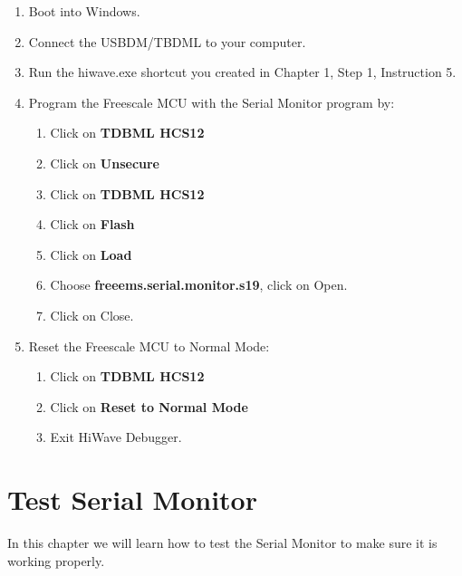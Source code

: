 \documentclass[12pt,notitlepage,onecolumn,oneside,openany]{memoir}
\begin{document}
\begin{enumerate}

\item \textsf{Boot into Windows.}

\item \textsf{Connect the USBDM/TBDML to your computer.}

\item \textsf{Run the hiwave.exe shortcut you created in Chapter 1, Step 1, Instruction 5.}

\item \textsf{Program the Freescale MCU with the Serial Monitor program by:} 
      \begin{enumerate}
      \item \textsf{Click on  \textbf{TDBML HCS12}}
      \item \textsf{Click on  \textbf{Unsecure}}
      \item \textsf{Click on  \textbf{TDBML HCS12}}
      \item \textsf{Click on  \textbf{Flash}}
      \item \textsf{Click on  \textbf{Load}}
      \item \textsf{Choose \textbf{freeems.serial.monitor.s19}, click on Open.} 
      \item \textsf{Click on Close.}
      \end{enumerate}

\item \textsf{Reset the Freescale MCU to Normal Mode:}
      \begin{enumerate}
      \item \textsf{Click on  \textbf{TDBML HCS12}}
      \item \textsf{Click on \textbf{Reset to Normal Mode}}
      \item \textsf{Exit HiWave Debugger.}
      \end{enumerate}

\end{enumerate}

\chapter{\textsf{Test Serial Monitor}}

\textsf{In this chapter we will learn how to test the Serial Monitor to make sure it is working properly.} \newline
\end{document}

